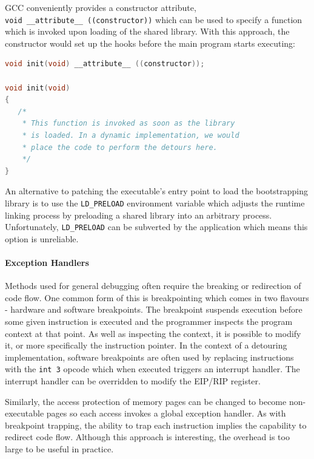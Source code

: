 GCC conveniently provides a constructor attribute, \texttt{\mbox{void \_\_attribute\_\_ ((constructor))}} which can be used to specify a function which is invoked upon loading of the shared library. With this approach, the constructor would set up the hooks before the main program starts executing:

\begin{lstlisting}[language=C,caption={This example would be compiled as a shared library}]
void init(void) __attribute__ ((constructor));

void init(void)
{
   /*
    * This function is invoked as soon as the library 
    * is loaded. In a dynamic implementation, we would
    * place the code to perform the detours here.
    */
}
\end{lstlisting}

An alternative to patching the executable's entry point to load the bootstrapping library is to use the \texttt{LD\_PRELOAD} environment variable which adjusts the runtime linking process by preloading a shared library into an arbitrary process. Unfortunately, \texttt{LD\_PRELOAD} can be subverted by the application which means this option is unreliable.

\paragraph{Exception Handlers}

Methods used for general debugging often require the breaking or redirection of code flow. One common form of this is breakpointing which comes in two flavours - hardware and software breakpoints. The breakpoint suspends execution before some given instruction is executed and the programmer inspects the program context at that point. As well as inspecting the context, it is possible to modify it, or more specifically the instruction pointer. In the context of a detouring implementation, software breakpoints are often used by replacing instructions with the \texttt{int 3} opcode which when executed triggers an interrupt handler. The interrupt handler can be overridden to modify the EIP/RIP register\cite{fast_breakpoints, profiling_unix, kprobes}.

Similarly, the access protection of memory pages can be changed to become non-executable pages so each access invokes a global exception handler. As with breakpoint trapping, the ability to trap each instruction implies the capability to redirect code flow. Although this approach is interesting, the overhead is too large to be useful in practice.